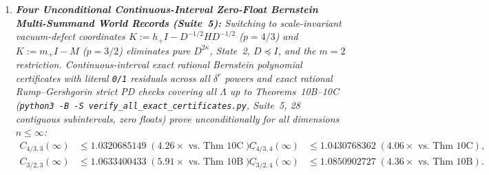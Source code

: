 \documentclass[10pt,letterpaper]{article}
\begin{document}
\begin{tcolorbox}[mathbox]
\begin{enumerate}[label=(\alph*),leftmargin=1.8em,itemsep=2pt,topsep=2pt]
  \item \emph{\textbf{Four Unconditional Continuous-Interval Zero-Float Bernstein Multi-Summand World Records (Suite~5):} Switching to scale-invariant vacuum-defect coordinates $K := h_+ I - D^{-1/2} H D^{-1/2}$ ($p = 4/3$) and $K := m_+ I - M$ ($p = 3/2$) eliminates pure $D^{2\kappa}$, State~2, $D \preceq I$, and the $m = 2$ restriction. Continuous-interval exact rational Bernstein polynomial certificates with literal \texttt{0/1} residuals across all $\delta^r$ powers and exact rational Rump--Gershgorin strict PD checks covering all $\Lambda$ up to Theorems~10B--10C (\texttt{python3 -B -S verify\_all\_exact\_certificates.py}, Suite~5, 28 contiguous subintervals, zero floats) prove unconditionally for all dimensions $n \le \infty$:}
  \begin{align*}
    C_{4/3,3}(\infty) &\le \mathbf{1.0320685149} \;(\mathbf{4.26\times}\text{ vs.\ Thm~10C}), &
    C_{4/3,4}(\infty) &\le \mathbf{1.0430768362} \;(\mathbf{4.06\times}\text{ vs.\ Thm~10C}), \\
    C_{3/2,3}(\infty) &\le \mathbf{1.0633400433} \;(\mathbf{5.91\times}\text{ vs.\ Thm~10B}), &
    C_{3/2,4}(\infty) &\le \mathbf{1.0850902727} \;(\mathbf{4.36\times}\text{ vs.\ Thm~10B}).
  \end{align*}
\end{enumerate}
\end{tcolorbox}
\end{document}
